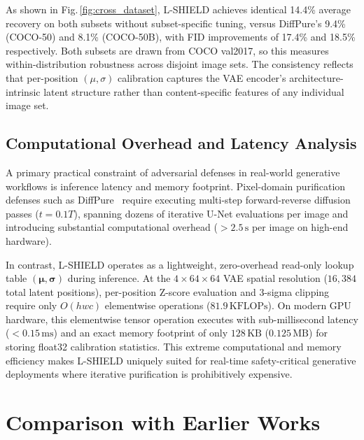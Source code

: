 \documentclass[conference]{IEEEtran}
\begin{document}
As shown in Fig.\,\ref{fig:cross_dataset}, L-SHIELD achieves identical 14.4\%
average recovery on both subsets without subset-specific tuning, versus
DiffPure's 9.4\% (COCO-50) and 8.1\% (COCO-50B), with FID improvements of
17.4\% and 18.5\% respectively. Both subsets are drawn from COCO val2017, so
this measures within-distribution robustness across disjoint image sets.
The consistency reflects that per-position $(\mu,\sigma)$ calibration captures
the VAE encoder's architecture-intrinsic latent structure rather than
content-specific features of any individual image set.

\subsection{Computational Overhead and Latency Analysis}

A primary practical constraint of adversarial defenses in real-world generative workflows is inference latency and memory footprint. Pixel-domain purification defenses such as DiffPure~\cite{nie2022diffusion} require executing multi-step forward-reverse diffusion passes ($t\!=\!0.1T$), spanning dozens of iterative U-Net evaluations per image and introducing substantial computational overhead ($>\!2.5\,\text{s}$ per image on high-end hardware).

In contrast, L-SHIELD operates as a lightweight, zero-overhead read-only lookup table $(\boldsymbol{\mu},\boldsymbol{\sigma})$ during inference. At the $4\!\times\!64\!\times\!64$ VAE spatial resolution ($16,384$ total latent positions), per-position Z-score evaluation and 3-sigma clipping require only $O(hwc)$ elementwise operations ($81.9\,\text{KFLOPs}$). On modern GPU hardware, this elementwise tensor operation executes with sub-millisecond latency ($<0.15\,\text{ms}$) and an exact memory footprint of only $128\,\text{KB}$ ($0.125\,\text{MB}$) for storing float32 calibration statistics. This extreme computational and memory efficiency makes L-SHIELD uniquely suited for real-time safety-critical generative deployments where iterative purification is prohibitively expensive.

\section{Comparison with Earlier Works}
\enlargethispage{25pt}
\end{document}
